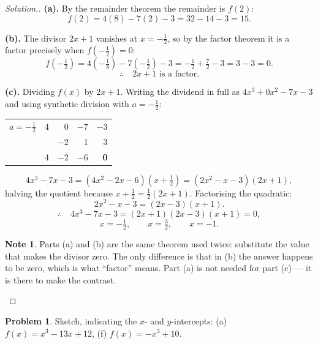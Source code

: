 \documentclass[11pt,a4paper]{article}
\theoremstyle{definition}
\newtheorem{note}[thm]{Note}
\newtheorem{problemx}{Problem}[section]
\newenvironment{problem}{\begin{problemx}}{\end{problemx}}
\newenvironment{solution}
  {\renewcommand{\qedsymbol}{}\begin{proof}[\textit{Solution}.]}
  {\end{proof}}
\begin{document}
\begin{solution}
\textbf{(a).} By the remainder theorem the remainder is $f(2)$:
$$f(2)=4(8)-7(2)-3=32-14-3=15.$$

\textbf{(b).} The divisor $2x+1$ vanishes at $x=-\frac{1}{2}$, so by the factor theorem
it is a factor precisely when $f\left(-\frac{1}{2}\right)=0$:
$$f\left(-\tfrac{1}{2}\right)=4\left(-\tfrac{1}{8}\right)-7\left(-\tfrac{1}{2}\right)-3
=-\tfrac{1}{2}+\tfrac{7}{2}-3=3-3=0.$$
$$\therefore\quad 2x+1 \text{ is a factor}.$$

\textbf{(c).} Dividing $f(x)$ by $2x+1$. Writing the dividend in full as
$4x^3+0x^2-7x-3$ and using synthetic division with $a=-\frac{1}{2}$:

\begin{table}[H]
\centering
\begin{tabular}{|c|r r r r|}
\hline
$a=-\frac{1}{2}$ & 4 & 0 & $-7$ & $-3$\\
                 &   & $-2$ & 1 & 3\\
\hline
                 & 4 & $-2$ & $-6$ & \textbf{0}\\
\hline
\end{tabular}
\end{table}

$$4x^3-7x-3=\left(4x^2-2x-6\right)\left(x+\tfrac{1}{2}\right)
=\left(2x^2-x-3\right)(2x+1),$$
halving the quotient because $x+\frac{1}{2}=\frac{1}{2}(2x+1)$. Factorising the
quadratic:
$$2x^2-x-3=(2x-3)(x+1).$$
$$\therefore\quad 4x^3-7x-3=(2x+1)(2x-3)(x+1)=0,$$
$$x=-\tfrac{1}{2},\qquad x=\tfrac{3}{2},\qquad x=-1.$$

\begin{note}
Parts (a) and (b) are the same theorem used twice: substitute the value that makes the
divisor zero. The only difference is that in (b) the answer happens to be zero, which is
what ``factor'' means. Part (a) is not needed for part (c) --- it is there to make the
contrast.
\end{note}
\end{solution}

\begin{problem}
Sketch, indicating the $x$- and $y$-intercepts:
\quad (a) $f(x)=x^3-13x+12$, \quad (f) $f(x)=-x^3+10$.
\end{problem}
\end{document}
